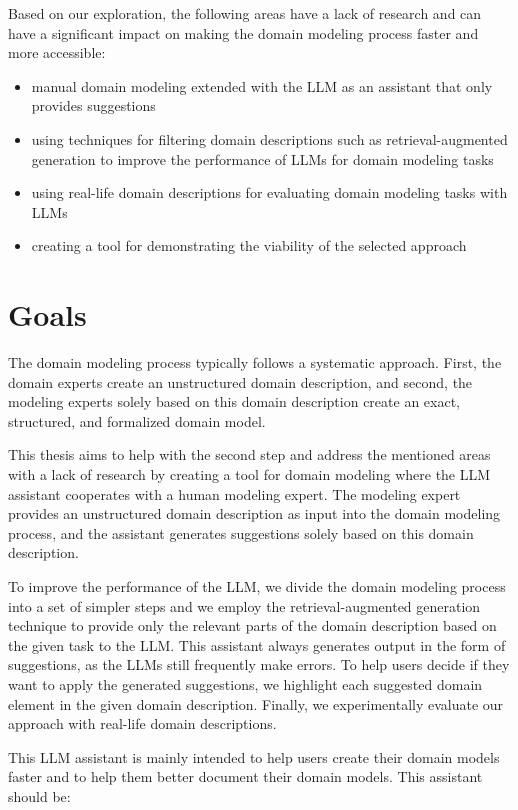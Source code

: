 Based on our exploration, the following areas have a lack of research and can have a significant impact on making the domain modeling process faster and more accessible:

\begin{itemize}
\item manual domain modeling extended with the LLM as an assistant that only provides suggestions
\item using techniques for filtering domain descriptions such as retrieval-augmented generation to improve the performance of LLMs for domain modeling tasks
\item using real-life domain descriptions for evaluating domain modeling tasks with LLMs
\item creating a tool for demonstrating the viability of the selected approach
\end{itemize}


\section*{Goals}

The domain modeling process typically follows a systematic approach. First, the domain experts create an unstructured domain description, and second, the modeling experts solely based on this domain description create an exact, structured, and formalized domain model.

This thesis aims to help with the second step and address the mentioned areas with a lack of research by creating a tool for domain modeling where the LLM assistant cooperates with a human modeling expert. The modeling expert provides an unstructured domain description as input into the domain modeling process, and the assistant generates suggestions solely based on this domain description.

To improve the performance of the LLM, we divide the domain modeling process into a set of simpler steps and we employ the retrieval-augmented generation technique to provide only the relevant parts of the domain description based on the given task to the LLM. This assistant always generates output in the form of suggestions, as the LLMs still frequently make errors. To help users decide if they want to apply the generated suggestions, we highlight each suggested domain element in the given domain description. Finally, we experimentally evaluate our approach with real-life domain descriptions.

This LLM assistant is mainly intended to help users create their domain models faster and to help them better document their domain models. This assistant should be:

